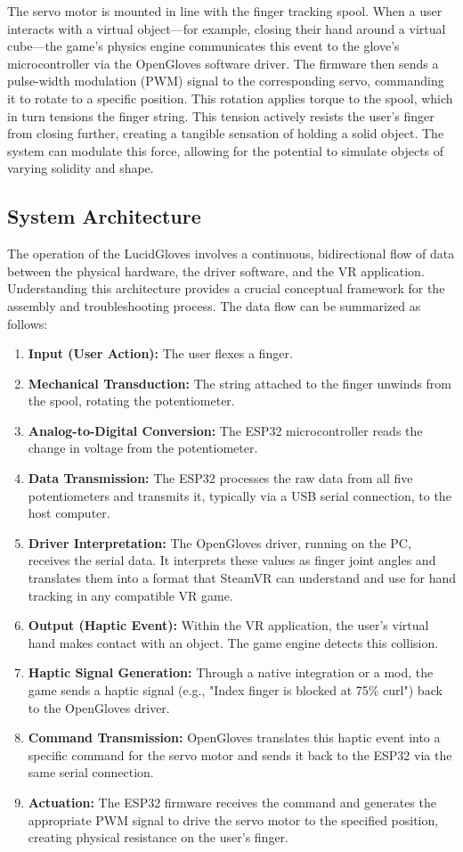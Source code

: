 \documentclass{article}
\begin{document}
The servo motor is mounted in line with the finger tracking spool. When a user interacts with a virtual object—for example, closing their hand around a virtual cube—the game's physics engine communicates this event to the glove's microcontroller via the OpenGloves software driver. The firmware then sends a pulse-width modulation (PWM) signal to the corresponding servo, commanding it to rotate to a specific position. This rotation applies torque to the spool, which in turn tensions the finger string. This tension actively resists the user's finger from closing further, creating a tangible sensation of holding a solid object. The system can modulate this force, allowing for the potential to simulate objects of varying solidity and shape.

\subsection{System Architecture}
The operation of the LucidGloves involves a continuous, bidirectional flow of data between the physical hardware, the driver software, and the VR application. Understanding this architecture provides a crucial conceptual framework for the assembly and troubleshooting process. The data flow can be summarized as follows:
\begin{enumerate}
    \item \textbf{Input (User Action):} The user flexes a finger.
    \item \textbf{Mechanical Transduction:} The string attached to the finger unwinds from the spool, rotating the potentiometer.
    \item \textbf{Analog-to-Digital Conversion:} The ESP32 microcontroller reads the change in voltage from the potentiometer.
    \item \textbf{Data Transmission:} The ESP32 processes the raw data from all five potentiometers and transmits it, typically via a USB serial connection, to the host computer.
    \item \textbf{Driver Interpretation:} The OpenGloves driver, running on the PC, receives the serial data. It interprets these values as finger joint angles and translates them into a format that SteamVR can understand and use for hand tracking in any compatible VR game.
    \item \textbf{Output (Haptic Event):} Within the VR application, the user's virtual hand makes contact with an object. The game engine detects this collision.
    \item \textbf{Haptic Signal Generation:} Through a native integration or a mod, the game sends a haptic signal (e.g., "Index finger is blocked at 75\% curl") back to the OpenGloves driver.
    \item \textbf{Command Transmission:} OpenGloves translates this haptic event into a specific command for the servo motor and sends it back to the ESP32 via the same serial connection.
    \item \textbf{Actuation:} The ESP32 firmware receives the command and generates the appropriate PWM signal to drive the servo motor to the specified position, creating physical resistance on the user's finger.
\end{enumerate}
\end{document}
